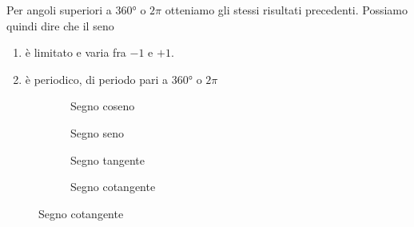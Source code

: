 Per angoli superiori a \ang{360} o $2\pi$ otteniamo gli stessi risultati  precedenti. 
Possiamo quindi dire che il seno
\begin{enumerate}
	\item è limitato e varia fra $-1$ e $+1$.
	\item è periodico, di periodo pari a \ang{360} o $2\pi$
\end{enumerate} 
\begin{figure}
	\centering
	
	\label{fig:AndamentoSeno1}
\end{figure}%
\begin{figure}
	\centering
	
	\label{fig:AndamentoSeno2}
\end{figure}%
\begin{figure}
	\begin{subfigure}[b]{.5\linewidth}
		\centering
		\caption{Segno coseno}\label{fig:SegnoCoseno}
	\end{subfigure}%
	\begin{subfigure}[b]{.5\linewidth}
		\centering
		\caption{Segno seno}\label{fig:SegnoSeno}
	\end{subfigure}
	\begin{subfigure}[b]{.5\linewidth}
		\centering
		\caption{Segno tangente}\label{fig:SegnoTangente}
	\end{subfigure}%
	\begin{subfigure}[b]{.5\linewidth}
		\centering
		\caption{Segno cotangente}\label{fig:SegnoCotangente}
	\end{subfigure}
	\label{tab:segnofunzionigoniometriche}
\end{figure}
